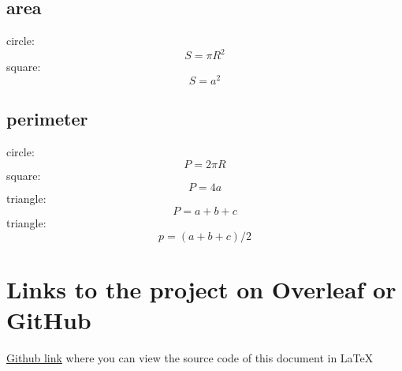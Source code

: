 \documentclass[12pt]{article}
\begin{document}
\subsection{area}
circle: $$S = \pi R^{2}$$
square: $$S = a^{2}$$

\subsection{perimeter}
circle: $$P = 2 \pi R$$
square: $$P = 4a$$
triangle: $$P = a + b + c$$
triangle: $$p = (a + b + c) / 2$$

\label{subsec:pythagoras}
\newpage
\section{Links to the project on Overleaf or GitHub}
\href{}{Github link} where you can view the source code of this document in LaTeX
\end{document}
